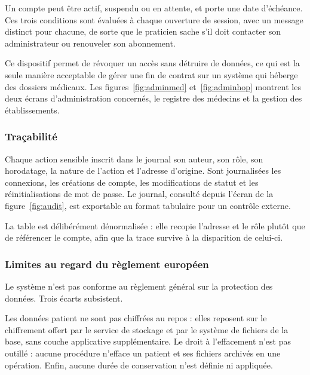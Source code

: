 Un compte peut être actif, suspendu ou en attente, et porte une date d'échéance. Ces trois
conditions sont évaluées à chaque ouverture de session, avec un message distinct pour chacune,
de sorte que le praticien sache s'il doit contacter son administrateur ou renouveler son
abonnement.

Ce dispositif permet de révoquer un accès sans détruire de données, ce qui est la
seule manière acceptable de gérer une fin de contrat sur un système qui héberge des dossiers
médicaux. Les figures~\ref{fig:adminmed} et~\ref{fig:adminhop} montrent les deux écrans
d'administration concernés, le registre des médecins et la gestion des établissements.



\subsubsection{Traçabilité}

Chaque action sensible inscrit dans le journal son auteur, son rôle, son horodatage, la nature
de l'action et l'adresse d'origine. Sont journalisées les connexions, les créations de compte,
les modifications de statut et les réinitialisations de mot de passe. Le journal, consulté
depuis l'écran de la figure~\ref{fig:audit}, est exportable au format tabulaire pour un
contrôle externe.

La table est délibérément dénormalisée : elle recopie l'adresse et le rôle plutôt que de
référencer le compte, afin que la trace survive à la disparition de celui-ci.


\subsubsection{Limites au regard du règlement européen}

Le système n'est pas conforme au règlement général sur la protection des données. Trois
écarts subsistent.

Les données patient ne sont pas chiffrées au repos : elles reposent sur le chiffrement
offert par le service de stockage et par le système de fichiers de la base, sans couche
applicative supplémentaire. Le droit à l'effacement n'est pas outillé : aucune
procédure n'efface un patient et ses fichiers archivés en une opération. Enfin, aucune
durée de conservation n'est définie ni appliquée.


